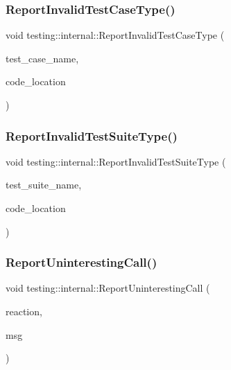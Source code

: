 \mbox{\label{namespacetesting_1_1internal_ab7e343160ee0aca7c8ae7c025a372453}} 
\subsubsection{\texorpdfstring{ReportInvalidTestCaseType()}{ReportInvalidTestCaseType()}}
{\footnotesize\ttfamily void testing\+::internal\+::\+Report\+Invalid\+Test\+Case\+Type (\begin{DoxyParamCaption}\item[{const char $\ast$}]{test\+\_\+case\+\_\+name,  }\item[{\mbox{\hyperlink{structtesting_1_1internal_1_1_code_location}{Code\+Location}}}]{code\+\_\+location }\end{DoxyParamCaption})}

\mbox{\label{namespacetesting_1_1internal_abbc0c3f8d5ee67a39d26167138effbe8}} 
\subsubsection{\texorpdfstring{ReportInvalidTestSuiteType()}{ReportInvalidTestSuiteType()}}
{\footnotesize\ttfamily void testing\+::internal\+::\+Report\+Invalid\+Test\+Suite\+Type (\begin{DoxyParamCaption}\item[{const char $\ast$}]{test\+\_\+suite\+\_\+name,  }\item[{\mbox{\hyperlink{structtesting_1_1internal_1_1_code_location}{Code\+Location}}}]{code\+\_\+location }\end{DoxyParamCaption})}

\mbox{\label{namespacetesting_1_1internal_af045b703d8487374620a8106a76814ee}} 
\subsubsection{\texorpdfstring{ReportUninterestingCall()}{ReportUninterestingCall()}}
{\footnotesize\ttfamily void testing\+::internal\+::\+Report\+Uninteresting\+Call (\begin{DoxyParamCaption}\item[{Call\+Reaction}]{reaction,  }\item[{const std\+::string \&}]{msg }\end{DoxyParamCaption})}

